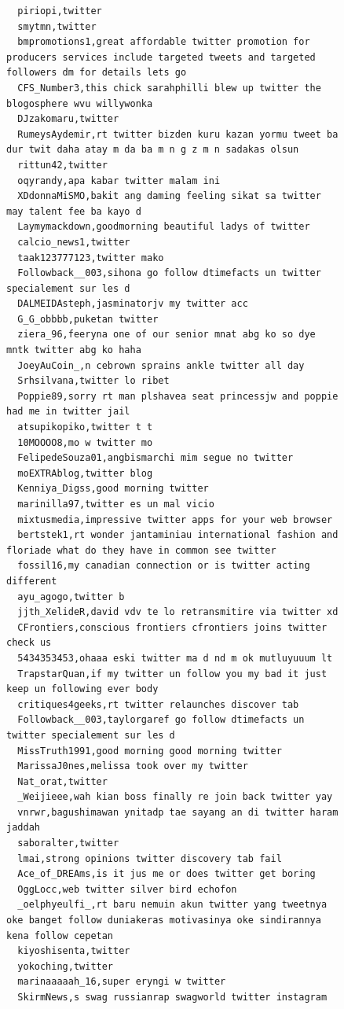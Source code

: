 \begin{figure}[htpb]
\begin{verbatim}
  piriopi,twitter
  smytmn,twitter
  bmpromotions1,great affordable twitter promotion for producers services include targeted tweets and targeted followers dm for details lets go
  CFS_Number3,this chick sarahphilli blew up twitter the blogosphere wvu willywonka
  DJzakomaru,twitter
  RumeysAydemir,rt twitter bizden kuru kazan yormu tweet ba dur twit daha atay m da ba m n g z m n sadakas olsun
  rittun42,twitter
  oqyrandy,apa kabar twitter malam ini
  XDdonnaMiSMO,bakit ang daming feeling sikat sa twitter may talent fee ba kayo d
  Laymymackdown,goodmorning beautiful ladys of twitter
  calcio_news1,twitter
  taak123777123,twitter mako
  Followback__003,sihona go follow dtimefacts un twitter specialement sur les d
  DALMEIDAsteph,jasminatorjv my twitter acc
  G_G_obbbb,puketan twitter
  ziera_96,feeryna one of our senior mnat abg ko so dye mntk twitter abg ko haha
  JoeyAuCoin_,n cebrown sprains ankle twitter all day
  Srhsilvana,twitter lo ribet
  Poppie89,sorry rt man plshavea seat princessjw and poppie had me in twitter jail
  atsupikopiko,twitter t t
  10MOOOO8,mo w twitter mo
  FelipedeSouza01,angbismarchi mim segue no twitter
  moEXTRAblog,twitter blog
  Kenniya_Digss,good morning twitter
  marinilla97,twitter es un mal vicio
  mixtusmedia,impressive twitter apps for your web browser
  bertstek1,rt wonder jantaminiau international fashion and floriade what do they have in common see twitter
  fossil16,my canadian connection or is twitter acting different
  ayu_agogo,twitter b
  jjth_XelideR,david vdv te lo retransmitire via twitter xd
  CFrontiers,conscious frontiers cfrontiers joins twitter check us
  5434353453,ohaaa eski twitter ma d nd m ok mutluyuuum lt
  TrapstarQuan,if my twitter un follow you my bad it just keep un following ever body
  critiques4geeks,rt twitter relaunches discover tab
  Followback__003,taylorgaref go follow dtimefacts un twitter specialement sur les d
  MissTruth1991,good morning good morning twitter
  MarissaJ0nes,melissa took over my twitter
  Nat_orat,twitter
  _Weijieee,wah kian boss finally re join back twitter yay
  vnrwr,bagushimawan ynitadp tae sayang an di twitter haram jaddah
  saboralter,twitter
  lmai,strong opinions twitter discovery tab fail
  Ace_of_DREAms,is it jus me or does twitter get boring
  OggLocc,web twitter silver bird echofon
  _oelphyeulfi_,rt baru nemuin akun twitter yang tweetnya oke banget follow duniakeras motivasinya oke sindirannya kena follow cepetan
  kiyoshisenta,twitter
  yokoching,twitter
  marinaaaaah_16,super eryngi w twitter
  SkirmNews,s swag russianrap swagworld twitter instagram

\end{verbatim}
\end{figure}

